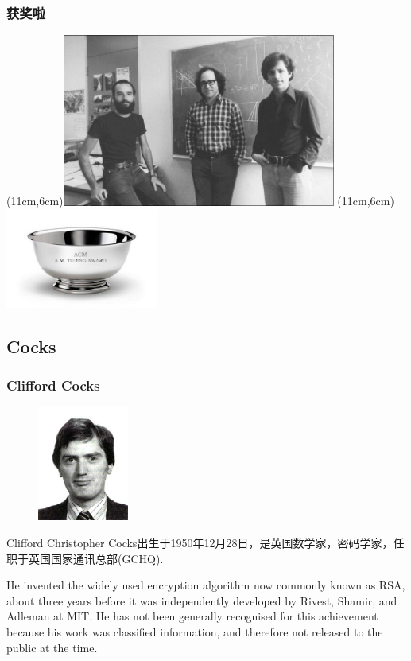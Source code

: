 \documentclass[slidestop,compress,mathserif]{beamer}
\begin{document}
\begin{frame}
  \transboxout
  \frametitle{获奖啦}
  \parpic(11cm,6cm){\includegraphics[width=9cm]{3peoples}}
  \parpic(11cm,6cm){\includegraphics[width=5cm]{turing}}


\end{frame}

\subsection{\hfill Cocks}
\begin{frame}
  \frametitle{Clifford Cocks}
  
  \begin{multicols}{2}
    \begin{figure}
      \includegraphics[width=3cm]{Cocks.jpg}
    \end{figure}
    Clifford Christopher Cocks出生于1950年12月28日，是英国数学家，密码学家，任职于英国国家通讯总部(GCHQ).
    
    He invented the widely used encryption algorithm now commonly known as RSA, about three years before it was independently developed by Rivest, Shamir, and Adleman at MIT. He has not been generally recognised for this achievement because his work was classified information, and therefore not released to the public at the time.

    
  \end{multicols}
  
\end{frame}
\end{document}
